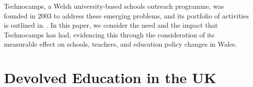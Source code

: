 \documentclass{sig-alternate}
\begin{document}

Technocamps, a Welsh university-based schools outreach programme,
was founded in 2003 to address these emerging problems,
and its portfolio of activities is outlined in~\cite{crick+moller-wipsce2015}.
In this paper, we consider the need and the impact that Technocamps has had,
evidencing this through the consideration of its measurable effect
on schools, teachers, and education policy changes in Wales.

\section{Devolved Education in the UK}\label{welshukedu}

\end{document}
